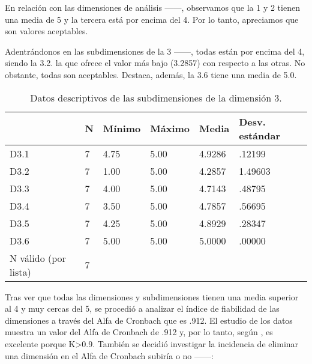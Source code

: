 \documentclass[spanish]{textolivre}
\begin{document}
En relación con las dimensiones de análisis ——, observamos que la 1 y 2 tienen una media de 5 y la tercera está por encima del 4. Por lo tanto, apreciamos que son valores aceptables.

Adentrándonos en las subdimensiones de la 3 ——, todas están por encima del 4, siendo la 3.2. la que ofrece el valor más bajo (3.2857) con respecto a las otras. No obstante, todas son aceptables. Destaca, además, la 3.6 tiene una media de 5.0.

\begin{table}[htbp]
\centering
\begin{threeparttable}
\caption{Datos descriptivos de las subdimensiones de la dimensión 3.}
\label{tbl7}
\centering
\begin{tabular}{llllll}
\toprule
 & N & Mínimo & Máximo & Media & Desv. estándar \\ 
\midrule
D3.1 & 7 & 4.75 & 5.00 & 4.9286 & .12199 \\
D3.2 & 7 & 1.00 & 5.00 & 4.2857 & 1.49603 \\
D3.3 & 7 & 4.00 & 5.00 & 4.7143 & .48795 \\
D3.4 & 7 & 3.50 & 5.00 & 4.7857 & .56695 \\
D3.5 & 7 & 4.25 & 5.00 & 4.8929 & .28347 \\
D3.6 & 7 & 5.00 & 5.00 & 5.0000 & .00000 \\
N válido (por lista) & 7 & & & & \\
\bottomrule
\end{tabular}
\end{threeparttable}
\end{table}

Tras ver que todas las dimensiones y subdimensiones tienen una media superior al 4 y muy cercas del 5, se procedió a analizar el índice de fiabilidad de las dimensiones a través del Alfa de Cronbach que es .912. El estudio de los datos muestra un valor del Alfa de Cronbach de .912  y, por lo tanto, según \textcite{george_spss_2003}, es excelente porque K>0.9. También se decidió investigar la incidencia de eliminar una dimensión en el Alfa de Cronbach subiría o no ——:
\end{document}

